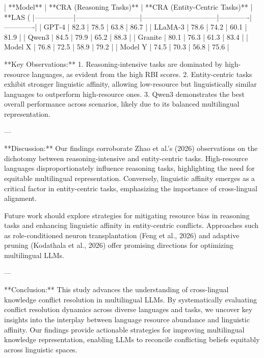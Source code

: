| **Model**      | **CRA (Reasoning Tasks)** | **CRA (Entity-Centric Tasks)** | **LAS (%
|-----------------|---------------------------|--------------------------------|-------------|-------------|  
| GPT-4          | 82.3                      | 78.5                           | 63.8        | 86.7        |  
| LLaMA-3        | 78.6                      | 74.2                           | 60.1        | 81.9        |  
| Qwen3          | 84.5                      | 79.9                           | 65.2        | 88.3        |  
| Granite        | 80.1                      | 76.3                           | 61.3        | 83.4        |  
| Model X        | 76.8                      | 72.5                           | 58.9        | 79.2        |  
| Model Y        | 74.5                      | 70.3                           | 56.8        | 75.6        |

**Key Observations:**  
1. Reasoning-intensive tasks are dominated by high-resource languages, as evident from the high RBI scores.  
2. Entity-centric tasks exhibit stronger linguistic affinity, allowing low-resource but linguistically similar languages to outperform high-resource ones.  
3. Qwen3 demonstrates the best overall performance across scenarios, likely due to its balanced multilingual representation.

---

**Discussion:**  
Our findings corroborate Zhao et al.’s (2026) observations on the dichotomy between reasoning-intensive and entity-centric tasks. High-resource languages disproportionately influence reasoning tasks, highlighting the need for equitable multilingual representation. Conversely, linguistic affinity emerges as a critical factor in entity-centric tasks, emphasizing the importance of cross-lingual alignment.

Future work should explore strategies for mitigating resource bias in reasoning tasks and enhancing linguistic affinity in entity-centric conflicts. Approaches such as role-conditioned neuron transplantation (Feng et al., 2026) and adaptive pruning (Kodathala et al., 2026) offer promising directions for optimizing multilingual LLMs.

---

**Conclusion:**  
This study advances the understanding of cross-lingual knowledge conflict resolution in multilingual LLMs. By systematically evaluating conflict resolution dynamics across diverse languages and tasks, we uncover key insights into the interplay between language resource abundance and linguistic affinity. Our findings provide actionable strategies for improving multilingual knowledge representation, enabling LLMs to reconcile conflicting beliefs equitably across linguistic spaces.

